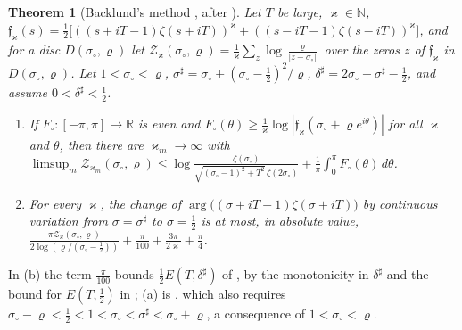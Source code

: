 \documentclass[preprint,12pt]{elsarticle}
\numberwithin{equation}{section}
\theoremstyle{plain}
\newtheorem{theorem}{Theorem}[section]
\theoremstyle{definition}
\theoremstyle{remark}
\newcommand{\R}{\mathbb R}
\begin{document}
\begin{theorem}[Backlund's method {\cite[Lemmas~2.1, 2.3 and 2.4]{BellottiWong2025}}, after {\cite{Trudgian2014,HasanalizadeShenWong2022}}]\label{thm:known_backlund}
Let $T$ be large, $\varkappa\in\mathbb N$, $\mathfrak f_\varkappa(s)=\frac12\bigl[((s+iT-1)\zeta(s+iT))^\varkappa+((s-iT-1)\zeta(s-iT))^\varkappa\bigr]$, and for a disc $D(\sigma_\circ,\varrho)$ let $\mathcal Z_\varkappa(\sigma_\circ,\varrho)=\frac1\varkappa\sum_z\log\frac{\varrho}{|z-\sigma_\circ|}$ over the zeros $z$ of $\mathfrak f_\varkappa$ in $D(\sigma_\circ,\varrho)$. Let $1<\sigma_\circ<\varrho$, $\sigma^\sharp=\sigma_\circ+(\sigma_\circ-\frac12)^2/\varrho$, $\delta^\sharp=2\sigma_\circ-\sigma^\sharp-\frac12$, and assume $0<\delta^\sharp<\frac12$.
\begin{enumerate}[label=(\alph*),leftmargin=2em]
\item If $F_\circ:[-\pi,\pi]\to\R$ is even and $F_\circ(\theta)\ge\frac1\varkappa\log|\mathfrak f_\varkappa(\sigma_\circ+\varrho e^{i\theta})|$ for all $\varkappa$ and $\theta$, then there are $\varkappa_m\to\infty$ with $\limsup_m\mathcal Z_{\varkappa_m}(\sigma_\circ,\varrho)\le\log\frac{\zeta(\sigma_\circ)}{\sqrt{(\sigma_\circ-1)^2+T^2}\,\zeta(2\sigma_\circ)}+\frac1\pi\int_0^\pi F_\circ(\theta)\,d\theta$.
\item For every $\varkappa$, the change of $\arg\bigl((\sigma+iT-1)\zeta(\sigma+iT)\bigr)$ by continuous variation from $\sigma=\sigma^\sharp$ to $\sigma=\frac12$ is at most, in absolute value,
$\frac{\pi\mathcal Z_\varkappa(\sigma_\circ,\varrho)}{2\log(\varrho/(\sigma_\circ-\frac12))}+\frac{\pi}{100}+\frac{3\pi}{2\varkappa}+\frac\pi4$.
\end{enumerate}
\end{theorem}
In (b) the term $\frac\pi{100}$ bounds $\frac12E(T,\delta^\sharp)$ of \cite[Lemma~2.3]{BellottiWong2025}, by the monotonicity in $\delta^\sharp$ and the bound for $E(T,\frac12)$ in \cite[Lemma~2.4]{BellottiWong2025}; (a) is \cite[Lemma~2.1]{BellottiWong2025}, which also requires $\sigma_\circ-\varrho<\frac12<1<\sigma_\circ<\sigma^\sharp<\sigma_\circ+\varrho$, a consequence of $1<\sigma_\circ<\varrho$.
\end{document}
